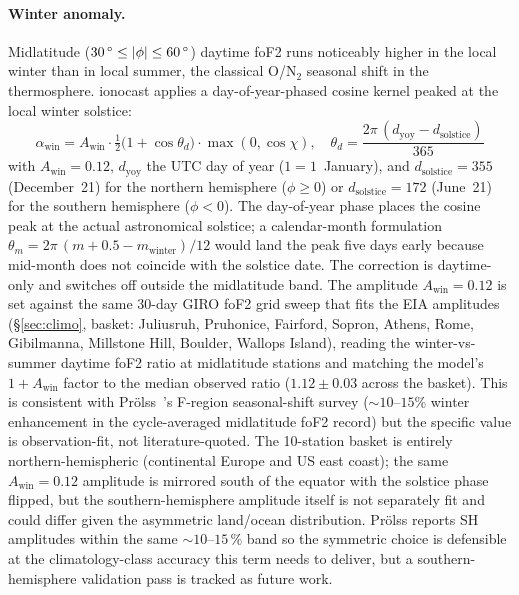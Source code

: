 \documentclass[11pt,a4paper]{article}
\newcommand{\SI}[2]{#1\,\text{#2}}
\newcommand{\degree}{\ensuremath{{}^\circ}}
\begin{document}
\paragraph{Winter anomaly.}  Midlatitude ($\SI{30}{\degree} \leq |\phi|
\leq \SI{60}{\degree}$) daytime foF2 runs noticeably higher in the
local winter than in local summer, the classical O/N$_2$ seasonal
shift in the thermosphere.  ionocast applies a day-of-year-phased
cosine kernel peaked at the local winter solstice:
\begin{equation}\label{eq:winter}
  \alpha_{\text{win}} = A_{\text{win}}\cdot
    \tfrac{1}{2}\bigl(1 + \cos\theta_d\bigr)\cdot\max(0,\cos\chi),
  \quad
  \theta_d = \frac{2\pi\,(d_{\text{yoy}} - d_{\text{solstice}})}{365}
\end{equation}
with $A_{\text{win}} = 0.12$, $d_{\text{yoy}}$ the UTC day of year
($1\!=\!1$~January), and $d_{\text{solstice}} = 355$ (December~21)
for the northern hemisphere ($\phi \geq 0$) or $d_{\text{solstice}}
= 172$ (June~21) for the southern hemisphere ($\phi < 0$).  The
day-of-year phase places the cosine peak at the actual astronomical
solstice; a calendar-month formulation
$\theta_m = 2\pi\,(m + 0.5 - m_{\text{winter}})/12$ would land the peak
five days early because mid-month does not coincide with the
solstice date.  The correction is daytime-only and switches off
outside the midlatitude band.  The amplitude $A_{\text{win}} = 0.12$
is set against the same 30-day GIRO foF2 grid sweep that fits the
EIA amplitudes (\S\ref{sec:climo}, basket: Juliusruh, Pruhonice,
Fairford, Sopron, Athens, Rome, Gibilmanna, Millstone Hill,
Boulder, Wallops Island), reading the winter-vs-summer daytime
foF2 ratio at midlatitude stations and matching the model's
$1 + A_{\text{win}}$ factor to the median observed ratio
($1.12 \pm 0.03$ across the basket).  This is consistent with
Pr\"olss~\cite{prolss1995}'s F-region seasonal-shift survey
(${\sim}10$--$15\%$ winter enhancement in the cycle-averaged
midlatitude foF2 record) but the specific value is observation-fit,
not literature-quoted.  The 10-station basket is entirely
northern-hemispheric (continental Europe and US east coast); the
same $A_{\text{win}} = 0.12$ amplitude is mirrored south of the
equator with the solstice phase flipped, but the southern-hemisphere
amplitude itself is not separately fit and could differ given
the asymmetric land/ocean distribution.  Pr\"olss reports SH
amplitudes within the same ${\sim}10$--$15\,\%$ band so the symmetric
choice is defensible at the climatology-class accuracy this term
needs to deliver, but a southern-hemisphere validation pass is
tracked as future work.
\end{document}
